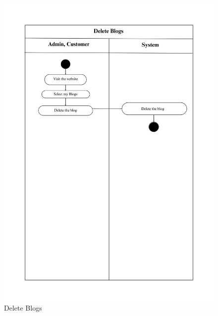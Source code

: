 \begin{figure}[h]
    \centering
    \includegraphics[width=1\textwidth]{Images/Activity Diagrams/10 Delete Blogs.png}
    \caption{Delete Blogs}
    \label{fig:activity-delete-blog}
\end{figure}


